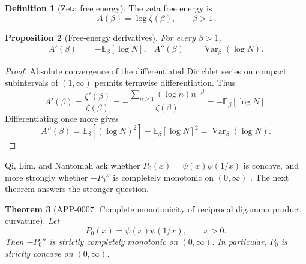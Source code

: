 \documentclass[11pt]{article}
\numberwithin{equation}{section}
\newtheorem{theorem}{Theorem}[section]
\newtheorem{proposition}[theorem]{Proposition}
\theoremstyle{definition}
\newtheorem{definition}[theorem]{Definition}
\theoremstyle{remark}
\DeclareMathOperator{\Var}{Var}
\newcommand{\E}{\mathbb E}
\newcommand{\1}{\mathbf 1}
\begin{document}
\begin{definition}[Zeta free energy]
\label{def:zeta-free-energy}
The zeta free energy is
\begin{equation}
\label{eq:zeta-free-energy}
A(\beta)=\log\zeta(\beta),\qquad \beta>1.
\end{equation}
\end{definition}

\begin{proposition}[Free-energy derivatives]
\label{prop:free-energy-derivatives}
For every \(\beta>1\),
\begin{align}
\label{eq:free-energy-derivatives}
A'(\beta)&=-\E_\beta[\log N],&
A''(\beta)&=\Var_\beta(\log N).
\end{align}
\end{proposition}

\begin{proof}
Absolute convergence of the differentiated Dirichlet series on compact subintervals of \((1,\infty)\) permits termwise differentiation.  Thus
\begin{equation}
\label{eq:first-free-derivative-proof}
A'(\beta)=\frac{\zeta'(\beta)}{\zeta(\beta)}
=-\frac{\sum_{n\ge1}(\log n)n^{-\beta}}{\zeta(\beta)}
=-\E_\beta[\log N].
\end{equation}
Differentiating once more gives
\begin{equation}
\label{eq:second-free-derivative-proof}
A''(\beta)=\E_\beta[(\log N)^2]-\E_\beta[\log N]^2
=\Var_\beta(\log N).
\end{equation}
\end{proof}

Qi, Lim, and Nantomah ask whether \(P_0(x)=\psi(x)\psi(1/x)\) is concave, and more strongly whether \(-P_0''\) is completely monotonic on \((0,\infty)\) \cite{qi-lim-nantomah-polygamma}.  The next theorem answers the stronger question.

\begin{theorem}[APP-0007: Complete monotonicity of reciprocal digamma product curvature]
\label{thm:reciprocal-digamma-product-complete-monotonicity}
Let
\begin{equation}
\label{eq:reciprocal-digamma-p0}
P_0(x)=\psi(x)\psi(1/x),\qquad x>0.
\end{equation}
Then \(-P_0''\) is strictly completely monotonic on \((0,\infty)\).  In particular, \(P_0\) is strictly concave on \((0,\infty)\).
\end{theorem}
\end{document}
